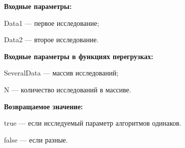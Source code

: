 \textbf{Входные параметры:}

Data1 --- первое исследование;
 
Data2 --- второе исследование.
	 
\textbf{Входные параметры в функциях перегрузках:}

SeveralData --- массив исследований;
 
N --- количество исследований в массиве.

\textbf{Возвращаемое значение:}

true --- если исследуемый параметр алгоритмов одинаков.
 
false --- если разные.